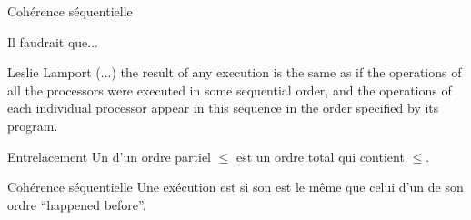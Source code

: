 
\begingroup

\begin{frame}[fragile]{Cohérence séquentielle}

  \begin{alertblock}{Il faudrait que...}
    \begin{shadequote}{Leslie Lamport}
      (...) the result of any execution is \alert{the same as} if the operations of all the processors were executed in some sequential order,
      and the operations of each individual processor appear in this sequence in the order specified by its program.
    \end{shadequote}
  \end{alertblock}

  \vfill

  \begin{block}{Entrelacement}
    Un  d'un ordre partiel $\le$ est un ordre total qui contient $\le$. 
  \end{block}
  \begin{block}{Cohérence séquentielle}
    Une exécution est  si son  est \alert{le même que} celui d'un  de son ordre ``happened before''.
  \end{block}


\end{frame}

\endgroup
\endinput
